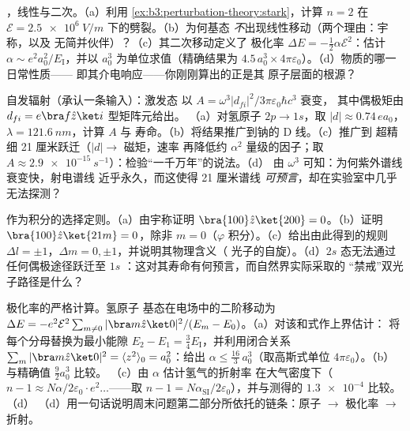 \begin{exercise}[$\star\star$]\label{exo:b3:perturbation-theory:7}
，线性与二次。（a）利用
\cref{ex:b3:perturbation-theory:stark}，计算 $n = 2$
在 $\mathcal E = \qty{2.5e6}{V/m}$ 下的劈裂。（b）为何基态
\emph{不}出现线性移动（两个理由：宇称，以及
无简并伙伴）？（c）其二次移动定义了
极化率 $\Delta E = -\tfrac12\alpha\mathcal E^2$：估计
$\alpha \sim e^2a_0^2/E_{\text{I}}$，并以
$a_0^3$ 为单位求值（精确结果为 $4.5\,a_0^3 \times
4\pi\varepsilon_0$）。（d）物质的哪一日常性质——
即其介电响应——你刚刚算出的正是其
原子层面的根源？
\end{exercise}

\begin{exercise}[$\star\star$]\label{exo:b3:perturbation-theory:8}
自发辐射（承认一条输入）：激发态
以 $A = \omega^3|d_{fi}|^2/3\pi\varepsilon_0\hbar c^3$ 衰变，
其中偶极矩由 $d_{fi} = e\bra f\hat z\ket i$ 型矩阵元给出。
（a）对氢原子 $2p \to 1s$，取 $|d| \approx 0.74\,
ea_0$，$\lambda = \qty{121.6}{nm}$，计算 $A$ 与
寿命。（b）将结果推广到钠的 D 线。（c）推广到
超精细 21 厘米跃迁（$|d| \to$ 磁矩，速率
再降低约 $\alpha^2$ 量级的因子；取 $A \approx
\qty{2.9e-15}{s^{-1}}$）：检验“一千万年”的说法。（d）
由 $\omega^3$ 可知：为何紫外谱线衰变快，射电谱线
近乎永久，而这使得 21 厘米谱线
\emph{可预言}，却在实验室中几乎无法探测？
\end{exercise}

\begin{exercise}[$\star\star$]\label{exo:b3:perturbation-theory:9}
作为积分的选择定则。（a）由宇称证明 $\bra{100}\hat z\ket{200} =
0$。（b）证明 $\bra{100}\hat z\ket{21m} = 0$，除非 $m =
0$（$\varphi$ 积分）。（c）给出由此得到的规则 $\Delta
l = \pm1$，$\Delta m = 0, \pm1$，并说明其物理含义（
光子的自旋）。（d）$2s$ 态无法通过任何偶极途径跃迁至 $1s$
：这对其寿命有何预言，而自然界实际采取的
“禁戒”双光子路径是什么？
\end{exercise}

\begin{exercise}[$\star\star\star$]\label{exo:b3:perturbation-theory:10}
极化率的严格计算。氢原子
基态在电场中的二阶移动为 $\Delta E = -e^2\mathcal E^2\sum_{m\neq
0}|\bra m\hat z\ket 0|^2/(E_m - E_0)$。（a）对该和式作上界估计：
将每个分母替换为最小能隙 $E_2 - E_1 =
\tfrac34 E_{\text{I}}$，并利用闭合关系 $\sum_m|\bra
m\hat z\ket0|^2 = \langle z^2\rangle_0 = a_0^2$：给出 $\alpha
\le \tfrac{16}3\,a_0^3$（取高斯式单位
$4\pi\varepsilon_0$）。（b）与精确值 $\tfrac92 a_0^3$ 比较。
（c）由 $\alpha$ 估计氢气的折射率
在大气密度下（$n - 1 \approx N\alpha/2\varepsilon_0
\cdot e^2\dots$——取 $n - 1 = N\alpha_{\text{SI}}/2
\varepsilon_0$），并与测得的 $\num{1.3e-4}$ 比较。（d）
（d）用一句话说明周末问题第二部分所依托的链条：原子 $\to$
极化率 $\to$ 折射。
\end{exercise}

